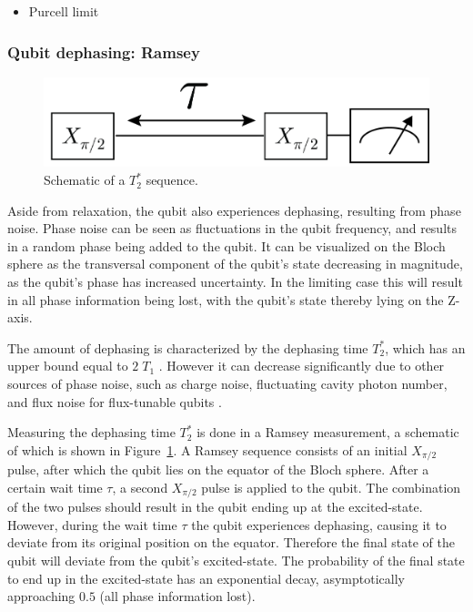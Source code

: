           \begin{itemize}
            \item Purcell limit
          \end{itemize}

        \subsubsection{Qubit dephasing: Ramsey}
          \label{sssec:Ramsey}

          \begin{figure}
            \begin{center}
            \vspace{-30pt}
              \includegraphics[width=\textwidth]{../Figures/Qubit characterization/T2 decoherence.png}
            \end{center}
            \vspace{-20 pt}
            \caption{Schematic of a $T_2^*$ sequence.}
            \label{fig:T2star schematic}
          \end{figure}

          Aside from relaxation, the qubit also experiences dephasing, resulting from phase noise. Phase noise can be seen as fluctuations in the qubit frequency, and results in a random phase being added to the qubit. It can be visualized on the Bloch sphere as the transversal component of the qubit's state decreasing in magnitude, as the qubit's phase has increased uncertainty. In the limiting case this will result in all phase information being lost, with the qubit's state thereby lying on the Z-axis.

          The amount of dephasing is characterized by the dephasing time $T_2^*$, which has an upper bound equal to $2\;T_1$ \cite[pp56-58]{Bishop}. However it can decrease significantly due to other sources of phase noise, such as charge noise, fluctuating cavity photon number, and flux noise for flux-tunable qubits \cite[p126]{Sears}.

          Measuring the dephasing time $T_2^*$ is done in a Ramsey measurement, a schematic of which is shown in Figure~\ref{fig:T2star schematic}. A Ramsey sequence consists of an initial $X_{\pi/2}$ pulse, after which the qubit lies on the equator of the Bloch sphere. After a certain wait time $\tau$, a second $X_{\pi/2}$ pulse is applied to the qubit. The combination of the two pulses should result in the qubit ending up at the excited-state. However, during the wait time $\tau$ the qubit experiences dephasing, causing it to deviate from its original position on the equator. Therefore the final state of the qubit will deviate from the qubit's excited-state. The probability of the final state to end up in the excited-state has an exponential decay, asymptotically approaching $0.5$ (all phase information lost).

